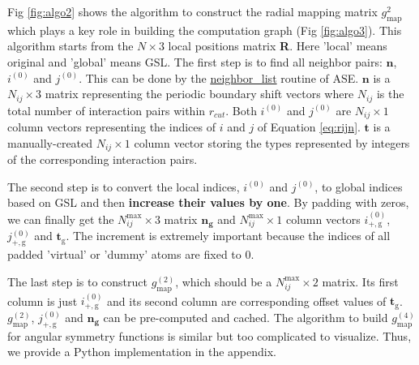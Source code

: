 \documentclass[prb,preprint]{revtex4-2}
\begin{document}
Fig \ref{fig:algo2} shows the algorithm to construct the radial mapping matrix
$g_{\mathrm{map}}^2$ which plays a key role in building the computation graph 
(Fig \ref{fig:algo3}). This algorithm starts from the $N \times 3$ local 
positions matrix \textbf{R}. Here 'local' means original and 'global' means GSL. 
The first step is to find all neighbor pairs: $\mathbf{n}$, $i^{(0)}$ and 
$j^{(0)}$. This can be done by the 
\href{https://wiki.fysik.dtu.dk/ase/ase/neighborlist.html}{neighbor\_list} 
routine of ASE\cite{ase}. $\mathbf{n}$ is a $N_{ij} \times 3$ matrix 
representing the periodic boundary shift vectors where $N_{ij}$ is the total 
number of interaction pairs within $r_{cut}$.
Both $i^{(0)}$ and $j^{(0)}$ are $N_{ij}\times 1$ column vectors representing 
the indices of $i$ and $j$ of Equation \ref{eq:rijn}. 
$\mathbf{t}$ is a manually-created $N_{ij}\times 1$ column vector storing the 
types \textemdash represented by integers \textemdash of the corresponding 
interaction pairs.

The second step is to convert the local indices, $i^{(0)}$ and $j^{(0)}$, to 
global indices based on GSL and then \textbf{increase their values by one}. 
By padding with zeros, we can finally get the $N_{ij}^{\mathrm{max}} \times 3$ 
matrix $\mathbf{n_g}$ and $N_{ij}^{\mathrm{max}} \times 1$ column vectors 
$i^{(0)}_{\mathrm{+,g}}$, $j^{(0)}_{\mathrm{+,g}}$ and 
$\mathbf{t}_{\mathrm{g}}$. The increment is extremely important because the 
indices of all padded 'virtual' or 'dummy' atoms are fixed to 0.

The last step is to construct $g_{\mathrm{map}}^{(2)}$, which should be a 
$N_{ij}^{\mathrm{max}} \times 2$ matrix. Its first column is just 
$i^{(0)}_{\mathrm{+,g}}$ and its second column are corresponding offset values 
of $\mathbf{t}_{\mathrm{g}}$. $g_{\mathrm{map}}^{(2)}$, 
$j^{(0)}_{\mathrm{+,g}}$ and $\mathbf{n_g}$ can be pre-computed and cached. 
The algorithm to build $g_{\mathrm{map}}^{(4)}$ for angular symmetry functions 
is similar but too complicated to visualize. Thus, we provide a Python 
implementation in the appendix. 
\end{document}
